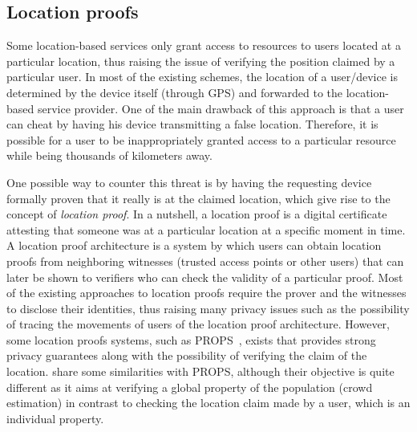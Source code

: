 \subsection{Location proofs}

Some location-based services only grant access to resources to users located at a particular location, thus raising the issue of verifying the position claimed by a particular user. 
In most of the existing schemes, the location of a user/device is determined by the device itself (\eg through GPS) and forwarded to the location-based service provider. 
One of the main drawback of this approach is that a user can cheat by having his device transmitting a false location. 
Therefore, it is possible for a user to be inappropriately granted access to a particular resource while being thousands of kilometers away.

One possible way to counter this threat is by having the requesting device formally proven that it really is at the claimed location, which give rise to the concept of \emph{location proof}. 
In a nutshell, a location proof is a digital certificate attesting that someone was at a particular location at a specific moment in time. A location proof architecture is a system by which users can obtain location proofs from neighboring witnesses (\eg trusted access points or other users) that can later be shown to verifiers who can check the validity of a particular proof.
Most of the existing approaches to location proofs require the prover and the witnesses to disclose their identities, thus raising many privacy issues such as the possibility of tracing the movements of users of the location proof architecture.
However, some location proofs systems, such as PROPS~\cite{PROPS}, exists that 
provides strong privacy guarantees along with the possibility of verifying the 
claim of the location. \PRIVO share some similarities with PROPS, although 
their objective is quite different as it aims at verifying a global property of 
the population (\ie crowd estimation) in contrast to checking the location 
claim made by a user, which is an individual property.

